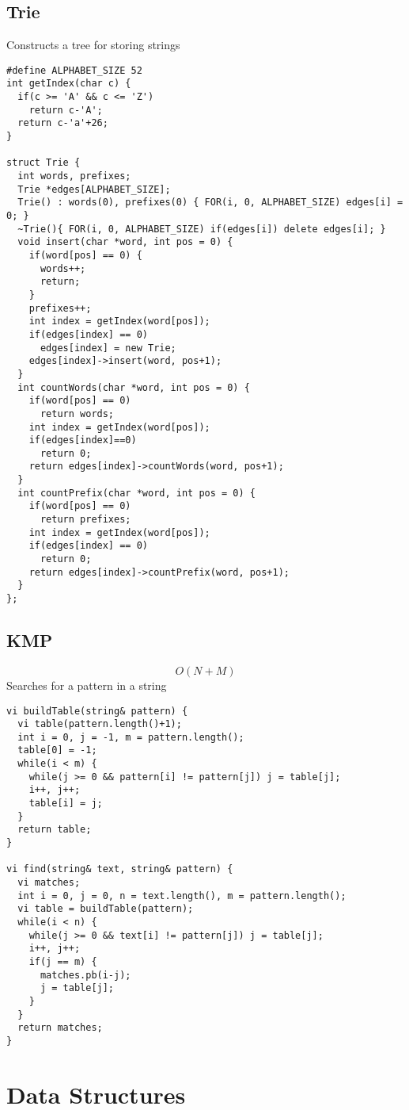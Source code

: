 \documentclass[11pt, oneside]{article}
\begin{document}
\subsection{Trie}
Constructs a tree for storing strings
\begin{lstlisting}
#define ALPHABET_SIZE 52
int getIndex(char c) {
  if(c >= 'A' && c <= 'Z')
    return c-'A';
  return c-'a'+26;
}

struct Trie {
  int words, prefixes;
  Trie *edges[ALPHABET_SIZE];
  Trie() : words(0), prefixes(0) { FOR(i, 0, ALPHABET_SIZE) edges[i] = 0; }
  ~Trie(){ FOR(i, 0, ALPHABET_SIZE) if(edges[i]) delete edges[i]; }
  void insert(char *word, int pos = 0) {
    if(word[pos] == 0) {
      words++;
      return;
    }
    prefixes++;
    int index = getIndex(word[pos]);
    if(edges[index] == 0)
      edges[index] = new Trie;
    edges[index]->insert(word, pos+1);
  }
  int countWords(char *word, int pos = 0) {
    if(word[pos] == 0)
      return words;
    int index = getIndex(word[pos]);
    if(edges[index]==0)
      return 0;
    return edges[index]->countWords(word, pos+1);
  }
  int countPrefix(char *word, int pos = 0) {
    if(word[pos] == 0)
      return prefixes;
    int index = getIndex(word[pos]);
    if(edges[index] == 0)
      return 0;
    return edges[index]->countPrefix(word, pos+1);
  }
};
\end{lstlisting}

\subsection{KMP}
\[O(N+M)\]
Searches for a pattern in a string
\begin{lstlisting}
vi buildTable(string& pattern) {
  vi table(pattern.length()+1);
  int i = 0, j = -1, m = pattern.length();
  table[0] = -1;
  while(i < m) {
    while(j >= 0 && pattern[i] != pattern[j]) j = table[j];
    i++, j++;
    table[i] = j;
  }
  return table;
}

vi find(string& text, string& pattern) {
  vi matches;
  int i = 0, j = 0, n = text.length(), m = pattern.length();
  vi table = buildTable(pattern);
  while(i < n) {
    while(j >= 0 && text[i] != pattern[j]) j = table[j];
    i++, j++;
    if(j == m) {
      matches.pb(i-j);
      j = table[j];
    }
  }
  return matches;
}
\end{lstlisting}

\section{Data Structures}
\end{document}
